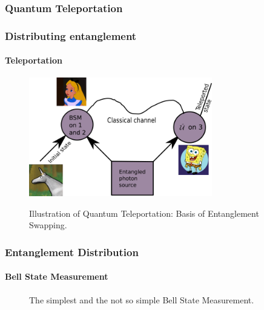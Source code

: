 \documentclass[serif,8pt]{beamer}
\begin{document}
\subsubsection{Quantum Teleportation}
\begin{frame}[t]
    \frametitle{Distributing entanglement}
    \framesubtitle{Teleportation}
    \begin{figure}[]
      \centering
      \caption{Illustration of Quantum Teleportation: Basis of Entanglement Swapping.}
      \includegraphics[width=8cm]{EntanglementTeleportation.png}
	\label{fig:Tele}
    \end{figure}
\end{frame}

\begin{frame}[t]
	\frametitle{Entanglement Distribution}
	\framesubtitle{Bell State Measurement}
	\begin{figure}
		\begin{center}
			\quad
		\end{center}
		\caption{The simplest and the not so simple Bell State Measurement.}
		\label{fig:BSMSimple}
	\end{figure}
\end{frame}
\end{document}
